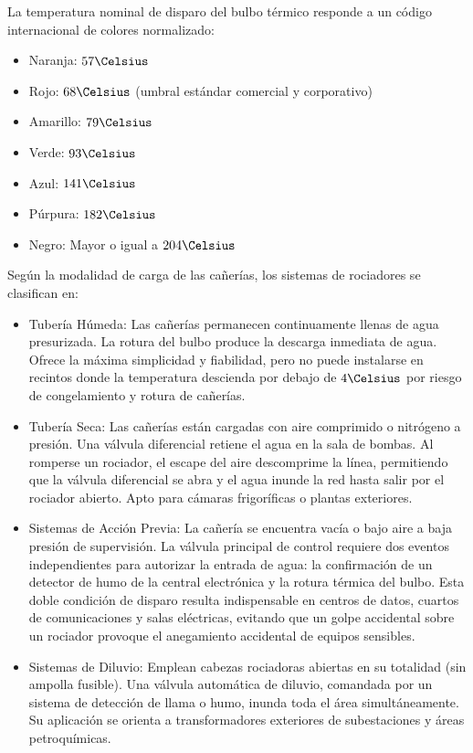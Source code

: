 La temperatura nominal de disparo del bulbo térmico responde a un código internacional de colores normalizado:
\begin{itemize}
    \item Naranja: $57\Celsius$
    \item Rojo: $68\Celsius$ (umbral estándar comercial y corporativo)
    \item Amarillo: $79\Celsius$
    \item Verde: $93\Celsius$
    \item Azul: $141\Celsius$
    \item Púrpura: $182\Celsius$
    \item Negro: Mayor o igual a $204\Celsius$
\end{itemize}

Según la modalidad de carga de las cañerías, los sistemas de rociadores se clasifican en:
\begin{itemize}
    \item Tubería Húmeda: Las cañerías permanecen continuamente llenas de agua presurizada. La rotura
          del bulbo produce la descarga inmediata de agua. Ofrece la máxima simplicidad y fiabilidad, pero no puede
          instalarse en recintos donde la temperatura descienda por debajo de $4\Celsius$ por riesgo de congelamiento y
          rotura de cañerías.
    \item Tubería Seca: Las cañerías están cargadas con aire comprimido o nitrógeno a presión. Una
          válvula diferencial retiene el agua en la sala de bombas. Al romperse un rociador, el escape del aire descomprime la
          línea, permitiendo que la válvula diferencial se abra y el agua inunde la red hasta salir por el rociador abierto.
          Apto para cámaras frigoríficas o plantas exteriores.
    \item Sistemas de Acción Previa: La cañería se encuentra vacía o bajo aire a baja presión de
          supervisión. La válvula principal de control requiere dos eventos independientes para autorizar la entrada de agua:
          la confirmación de un detector de humo de la central electrónica y la rotura térmica del bulbo. Esta doble
          condición de disparo resulta indispensable en centros de datos, cuartos de comunicaciones y salas eléctricas,
          evitando que un golpe accidental sobre un rociador provoque el anegamiento accidental de equipos sensibles.
    \item Sistemas de Diluvio: Emplean cabezas rociadoras abiertas en su totalidad (sin ampolla fusible).
          Una válvula automática de diluvio, comandada por un sistema de detección de llama o humo, inunda toda el área
          simultáneamente. Su aplicación se orienta a transformadores exteriores de subestaciones y áreas petroquímicas.
\end{itemize}


